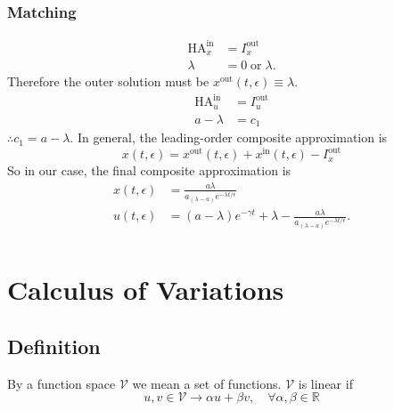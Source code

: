 \documentclass[12pt,twoside]{article}
\begin{document}
\subsubsection{Matching}
\begin{equation*}
  \begin{aligned}
    \text{HA}^{\text{in}}_x &= I^{\text{out}}_x \\
    \lambda &= 0 \;\text{or}\; \boxed{\lambda}.
  \end{aligned}
\end{equation*}
Therefore the outer solution must be $x^{\text{out}}(t,\epsilon)\equiv \lambda$.
\begin{equation*}
  \begin{aligned}
    \text{HA}^{\text{in}}_u &= I^{\text{out}}_u \\
    a-\lambda &= c_1
  \end{aligned}
\end{equation*}
$\therefore c_1=a-\lambda$. In general, the leading-order composite approximation
is
\begin{equation*}
  x(t,\epsilon) = x^{\text{out}}(t,\epsilon) + x^{\text{in}}(t,\epsilon) - I^{\text{out}}_x
\end{equation*}
So in our case, the final composite approximation is
\begin{equation*} \boxed{
    \begin{aligned}
      x(t,\epsilon) &= \frac{a\lambda}{a_(\lambda-a)e^{-\lambda t/\epsilon}} \\
      u(t,\epsilon) &= (a-\lambda)e^{-\gamma t} + \lambda -
      \frac{a\lambda}{a_(\lambda-a)e^{-\lambda t/\epsilon}}. \\
    \end{aligned}
  }
\end{equation*}

\section{}

\section{Calculus of Variations}
\subsection{Definition}
By a function space $\mathcal{V}$ we mean a set of functions. $\mathcal{V}$ is
linear if
\begin{equation*}
  u,v\in\mathcal{V} \longrightarrow \alpha u+\beta v,\quad \forall \alpha,\beta\in\mathbb{R}
\end{equation*}
\end{document}
